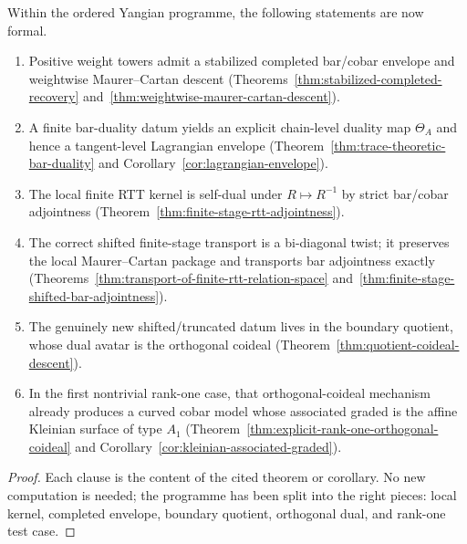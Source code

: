 \begin{theorem}
\label{thm:fortified-frontier-package}
Within the ordered Yangian programme, the following statements are now formal.
\begin{enumerate}[label=\textup{(\arabic*)}]
\item Positive weight towers admit a stabilized completed bar/cobar envelope and
 weightwise Maurer--Cartan descent
 \textup{(}Theorems~\ref{thm:stabilized-completed-recovery}
 and~\ref{thm:weightwise-maurer-cartan-descent}\textup{)}.
\item A finite bar-duality datum yields an explicit chain-level duality map
 $\Theta_A$ and hence a tangent-level Lagrangian envelope
 \textup{(}Theorem~\ref{thm:trace-theoretic-bar-duality} and
 Corollary~\ref{cor:lagrangian-envelope}\textup{)}.
\item The local finite RTT kernel is self-dual under
 $R\mapsto R^{-1}$ by strict bar/cobar adjointness
 \textup{(}Theorem~\ref{thm:finite-stage-rtt-adjointness}\textup{)}.
\item The correct shifted finite-stage transport is a bi-diagonal twist; it
 preserves the local Maurer--Cartan package and transports bar adjointness
 exactly \textup{(}Theorems~\ref{thm:transport-of-finite-rtt-relation-space}
 and~\ref{thm:finite-stage-shifted-bar-adjointness}\textup{)}.
\item The genuinely new shifted/truncated datum lives in the boundary quotient,
 whose dual avatar is the orthogonal coideal
 \textup{(}Theorem~\ref{thm:quotient-coideal-descent}\textup{)}.
\item In the first nontrivial rank-one case, that orthogonal-coideal mechanism
 already produces a curved cobar model whose associated graded is the affine
 Kleinian surface of type $A_1$
 \textup{(}Theorem~\ref{thm:explicit-rank-one-orthogonal-coideal} and
 Corollary~\ref{cor:kleinian-associated-graded}\textup{)}.
\end{enumerate}
\end{theorem}

\begin{proof}
Each clause is the content of the cited theorem or corollary. No new computation is needed; the programme has been split
into the right pieces: local kernel, completed envelope, boundary quotient,
orthogonal dual, and rank-one test case.
\end{proof}

